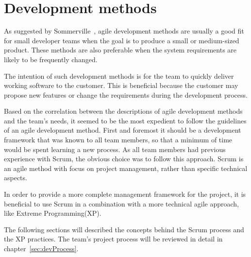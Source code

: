 \section{Development methods}
\label{sec:devMethods}

As suggested by Sommerville~\cite{scrum}, agile development methods are usually a good fit for small developer teams when the goal is to produce a small or medium-sized product. These methods are also preferable when the system requirements are likely to be frequently changed.

The intention of such development methods is for the team to quickly deliver working software to the customer. This is beneficial because the customer may propose new features or change the requirements during the development process.

Based on the correlation between the descriptions of agile development methods and the team's needs, it seemed to be the most expedient to follow the guidelines of an agile development method. First and foremost it should be a development framework that was known to all team members, so that a minimum of time would be spent learning a new process. As all team members had previous experience with Scrum, the obvious choice was to follow this approach. Scrum is an agile method with focus on project management, rather than specific technical aspects.

In order to provide a more complete management framework for the project, it is beneficial to use Scrum in a combination with a more technical agile approach, like Extreme Programming(XP).

The following sections will described the concepts behind the Scrum process and the XP practices. The team's project process will be reviewed in detail in chapter~\ref{sec:devProcess}.
